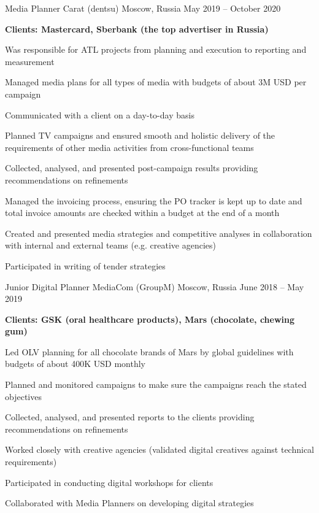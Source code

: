 \documentclass[11pt, a4paper]{awesome-cv}
\begin{document}
\begin{cventries}
\cventry
	{Media Planner}
	{Carat (dentsu)}
	{Moscow, Russia}
	{May 2019 -- October 2020}
	{
		\begin{cvitems}
			\item[] {\bf Clients: Mastercard, Sberbank (the top advertiser in Russia)}
			\item {Was responsible for ATL projects from planning and execution to reporting and measurement}
			\item {Managed media plans for all types of media with budgets of about 3M USD per campaign}
			\item {Communicated with a client on a day-to-day basis}
			\item {Planned TV campaigns and ensured smooth and holistic delivery of the requirements of other media activities from cross-functional teams}
			\item {Collected, analysed, and presented post-campaign results providing recommendations on refinements}
			\item {Managed the invoicing process, ensuring the PO tracker is kept up to date and total invoice amounts are checked within a budget at the end of a month}
			\item {Created and presented media strategies and competitive analyses in collaboration with internal and external teams (e.g. creative agencies)}
			\item {Participated in writing of tender strategies}
		\end{cvitems}
	}
	
\cventry
	{Junior Digital Planner}
	{MediaCom (GroupM)}
	{Moscow, Russia}
	{June 2018 -- May 2019}
	{
		\begin{cvitems}
			\item[] {\bf Clients: GSK (oral healthcare products), Mars (chocolate, chewing gum)}
			\item {Led OLV planning for all chocolate brands of Mars by global guidelines with budgets of about 400K USD monthly}
			\item {Planned and monitored campaigns to make sure the campaigns reach the stated objectives}
			\item {Collected, analysed, and presented reports to the clients providing recommendations on refinements}
			\item {Worked closely with creative agencies (validated digital creatives against technical requirements)}
			\item {Participated in conducting digital workshops for clients}
			\item {Collaborated with Media Planners on developing digital strategies}
		\end{cvitems}
	}


\end{cventries}
\end{document}
